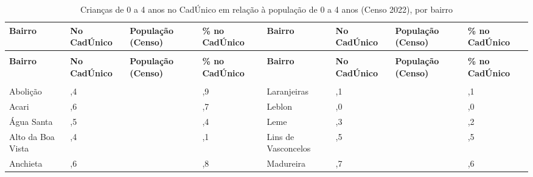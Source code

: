 \begin{apendicesenv}
{\renewcommand{\arraystretch}{1.0}
{\footnotesize\setlength{\tabcolsep}{3.5pt}
\begin{longtable}{@{}>{\raggedright\arraybackslash}p{2.95cm}>{\raggedleft\arraybackslash}p{1.25cm}>{\raggedleft\arraybackslash}p{1.25cm}>{\raggedleft\arraybackslash}p{1.25cm}@{\hspace{0.6cm}}>{\raggedright\arraybackslash}p{2.95cm}>{\raggedleft\arraybackslash}p{1.25cm}>{\raggedleft\arraybackslash}p{1.25cm}>{\raggedleft\arraybackslash}p{1.25cm}@{}}
\caption{Crianças de 0 a 4 anos no CadÚnico em relação à população de 0 a 4 anos (Censo 2022), por bairro}\label{tab:tabela-mapa-cadunico-criancas-0-a-4-2026}\\
\toprule \hyphenpenalty=10000\exhyphenpenalty=10000\textbf{Bairro} & \hyphenpenalty=10000\exhyphenpenalty=10000\textbf{No CadÚnico} & \hyphenpenalty=10000\exhyphenpenalty=10000\textbf{População (Censo)} & \hyphenpenalty=10000\exhyphenpenalty=10000\textbf{\% no CadÚnico} & \hyphenpenalty=10000\exhyphenpenalty=10000\textbf{Bairro} & \hyphenpenalty=10000\exhyphenpenalty=10000\textbf{No CadÚnico} & \hyphenpenalty=10000\exhyphenpenalty=10000\textbf{População (Censo)} & \hyphenpenalty=10000\exhyphenpenalty=10000\textbf{\% no CadÚnico} \\ \midrule \endfirsthead
\multicolumn{8}{@{}l}{\footnotesize\itshape (continuação)}\\ \toprule \hyphenpenalty=10000\exhyphenpenalty=10000\textbf{Bairro} & \hyphenpenalty=10000\exhyphenpenalty=10000\textbf{No CadÚnico} & \hyphenpenalty=10000\exhyphenpenalty=10000\textbf{População (Censo)} & \hyphenpenalty=10000\exhyphenpenalty=10000\textbf{\% no CadÚnico} & \hyphenpenalty=10000\exhyphenpenalty=10000\textbf{Bairro} & \hyphenpenalty=10000\exhyphenpenalty=10000\textbf{No CadÚnico} & \hyphenpenalty=10000\exhyphenpenalty=10000\textbf{População (Censo)} & \hyphenpenalty=10000\exhyphenpenalty=10000\textbf{\% no CadÚnico} \\ \midrule \endhead
\midrule \multicolumn{8}{r@{}}{\footnotesize\itshape (continua)}\\ \endfoot
\bottomrule \endlastfoot
Abolição & 0,4 & 313 & 41,9 & Laranjeiras & 0,1 & 1.389 & 7,1 \\
Acari & 0,6 & 2.112 & 62,7 & Leblon & 0,0 & 1.199 & 3,0 \\
Água Santa & 0,5 & 280 & 45,4 & Leme & 0,3 & 422 & 32,2 \\
Alto da Boa Vista & 0,4 & 418 & 36,1 & Lins de Vasconcelos & 0,5 & 1.502 & 51,5 \\
Anchieta & 0,6 & 2.866 & 64,8 & Madureira & 0,7 & 1.766 & 66,6 \\

\end{longtable}}}
\end{apendicesenv}
